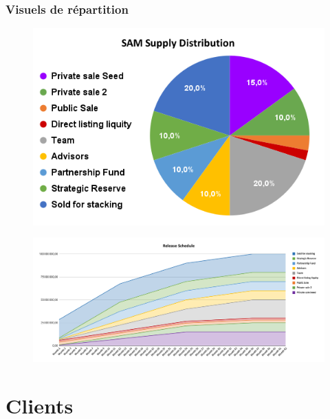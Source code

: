 ﻿\documentclass[a4paper]{article}
\begin{document}
\subsubsection{Visuels de répartition}
 
\begin{figure}[!h]
\centering
\includegraphics[scale=0.5]{SAM_Supply_Distribution.png}
\end{figure}

\begin{figure}[!h]
\centering
\includegraphics[scale=0.3]{Release_schedule.png}
\end{figure}

\newpage
\section{Clients}
\end{document}
